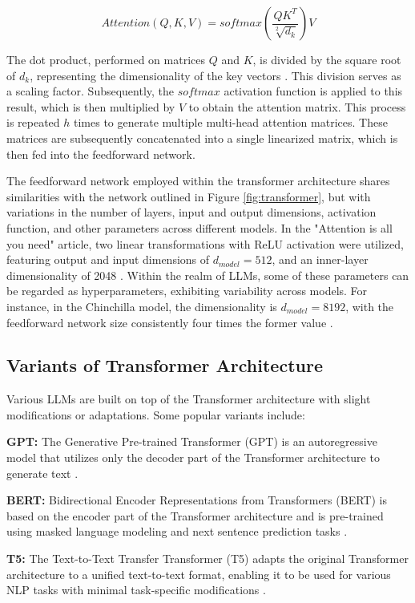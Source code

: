 \begin{equation}\label{eq:attention}
    Attention(Q,K,V) = softmax(\frac{QK^T}{\sqrt[2]{d_k}})V
\end{equation}

The dot product, performed on matrices \(Q\) and \(K\), is divided by the square root of \(d_k\), representing the dimensionality of the key vectors \cite{vaswani2023attention}. This division serves as a scaling factor. Subsequently, the \(softmax\) activation function is applied to this result, which is then multiplied by \(V\) to obtain the attention matrix. This process is repeated \(h\) times to generate multiple multi-head attention matrices. These matrices are subsequently concatenated into a single linearized matrix, which is then fed into the feedforward network.

The feedforward network employed within the transformer architecture shares similarities with the network outlined in Figure \ref{fig:transformer}, but with variations in the number of layers, input and output dimensions, activation function, and other parameters across different models. In the "Attention is all you need" article, two linear transformations with ReLU activation were utilized, featuring output and input dimensions of \(d_{model} = 512\), and an inner-layer dimensionality of 2048 \cite{vaswani2023attention}. Within the realm of LLMs, some of these parameters can be regarded as hyperparameters, exhibiting variability across models. For instance, in the Chinchilla  model, the dimensionality is \(d_{model} = 8192\), with the feedforward network size consistently four times the former value \cite{hoffmann2022training}.

\subsection{Variants of Transformer Architecture}

Various LLMs are built on top of the Transformer architecture with slight modifications or adaptations. Some popular variants include:

\textbf{GPT:} The Generative Pre-trained Transformer (GPT) is an autoregressive model that utilizes only the decoder part of the Transformer architecture to generate text \cite{openai:gpt}.

\textbf{BERT:} Bidirectional Encoder Representations from Transformers (BERT) is based on the encoder part of the Transformer architecture and is pre-trained using masked language modeling and next sentence prediction tasks \cite{devlin2019bert}.

\textbf{T5:} The Text-to-Text Transfer Transformer (T5) adapts the original Transformer architecture to a unified text-to-text format, enabling it to be used for various NLP tasks with minimal task-specific modifications \cite{raffel2023exploring}.